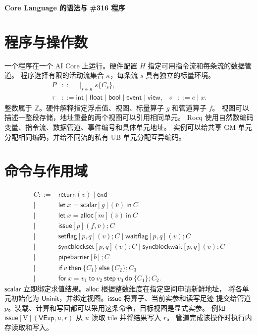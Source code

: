\documentclass[UTF8,a4paper,11pt,fontset=fandol]{ctexart}
\newcommand{\kw}[1]{\mathsf{#1}}
\begin{document}
\begin{center}\Large\bfseries Core Language 的语法与 \#316 程序\end{center}

\section{程序与操作数}
一个程序在一个 AI Core 上运行。硬件配置 \(H\) 指定可用指令流和每条流的数据管道。
程序选择有限的活动流集合 \(\kappa\)，每条流 \(s\) 具有独立的标量环境。
\[
\begin{aligned}
 P &::= \mathop{\|}_{s\in\kappa}s\{C_s\},\\
 \tau &::= \kw{int}\mid\kw{float}\mid\kw{bool}\mid\kw{event}\mid\kw{view},
 &v &::= c\mid x .
\end{aligned}
\]
整数属于 \(\mathbb Z\)。硬件解释指定浮点值、视图、标量算子 \(g\) 和管道算子 \(f\)。
视图可以描述一整段存储，地址重叠的两个视图可以引用相同单元。
Rocq 使用自然数编码变量、指令流、数据管道、事件编号和具体单元地址。
实例可以给共享 GM 单元分配相同编码，并给不同流的私有 UB 单元分配互异编码。

\section{命令与作用域}
\[
\begin{aligned}
 C ::= {}&\kw{return}(\bar v)\mid\kw{end}\\
  \mid{}&\kw{let}\ x=\kw{scalar}[g](\bar v)\ \kw{in}\ C\\
  \mid{}&\kw{let}\ x=\kw{alloc}[m](\bar v)\ \kw{in}\ C\\
  \mid{}&\kw{issue}[p](f,\bar v);C\\
  \mid{}&\kw{setflag}[p,q](v);C\mid\kw{waitflag}[p,q](v);C\\
  \mid{}&\kw{syncblockset}[p,q](v);C\mid\kw{syncblockwait}[p,q](v);C\\
  \mid{}&\kw{pipebarrier}[b];C\\
  \mid{}&\kw{if}\ v\ \kw{then}\ \{C_1\}\ \kw{else}\ \{C_2\};C_3\\
  \mid{}&\kw{for}\ x=v_1\ \kw{to}\ v_2\ \kw{step}\ v_3\ \kw{do}\ \{C_1\};C_2 .
\end{aligned}
\]
\(\kw{scalar}\) 立即绑定求值结果。\(\kw{alloc}\) 根据整数维度在指定空间申请新鲜地址，
将各单元初始化为 \(\kw{Uninit}\)，并绑定视图。\(\kw{issue}\) 将算子、当前实参和读写足迹
提交给管道 \(p\)。装载、计算和写回都可以采用这条命令，目标视图是显式实参。
例如 \(\kw{issue}[\mathrm V](\kw{VExp},u,r)\) 从 \(u\) 读取 tile 并将结果写入 \(r\)。
管道完成该操作时执行内存读取和写入。
\end{document}
